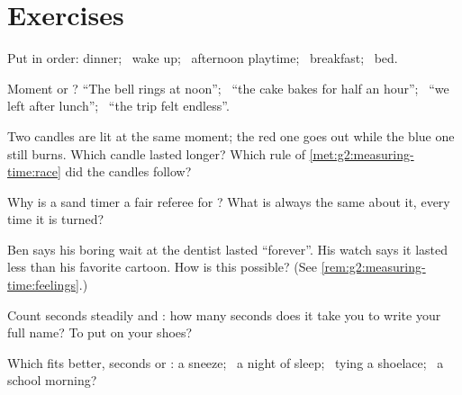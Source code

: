 \section{Exercises}

\begin{exercise}[$\star$]\label{exo:g2:measuring-time:1}
Put in order: dinner; \ wake up; \ afternoon playtime; \ breakfast;
\ bed.
\end{exercise}

\begin{exercise}[$\star$]\label{exo:g2:measuring-time:2}
Moment or ? ``The bell rings at noon''; \ ``the cake bakes
for half an hour''; \ ``we left after lunch''; \ ``the trip felt
endless''.
\end{exercise}

\begin{exercise}[$\star$]\label{exo:g2:measuring-time:3}
Two candles are lit at the same moment; the red one goes out while
the blue one still burns. Which candle lasted longer? Which rule of
\cref{met:g2:measuring-time:race} did the candles follow?
\end{exercise}

\begin{exercise}[$\star$]\label{exo:g2:measuring-time:4}
Why is a sand timer a fair referee for ? What is always the
same about it, every time it is turned?
\end{exercise}

\begin{exercise}[$\star$]\label{exo:g2:measuring-time:5}
Ben says his boring wait at the dentist lasted ``forever''. His
watch says it lasted less than his favorite cartoon. How is this
possible? (See \cref{rem:g2:measuring-time:feelings}.)
\end{exercise}

\begin{exercise}[$\star$]\label{exo:g2:measuring-time:6}
Count seconds steadily and : how many seconds does it take
you to write your full name? To put on your shoes?
\end{exercise}

\begin{exercise}[$\star$]\label{exo:g2:measuring-time:7}
Which  fits better, seconds or : a sneeze; \ a night of
sleep; \ tying a shoelace; \ a school morning?
\end{exercise}

